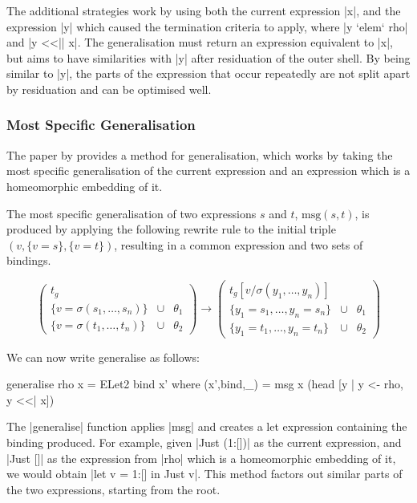 The additional strategies work by using both the current expression |x|, and the expression |y| which caused the termination criteria to apply, where |y `elem` rho| and |y <<|| x|. The generalisation must return an expression equivalent to |x|, but aims to have similarities with |y| after residuation of the outer shell. By being similar to |y|, the parts of the expression that occur repeatedly are not split apart by residuation and can be optimised well.

\subsubsection{Most Specific Generalisation}

The paper by \citet{sorensen:supercompilation} provides a method for generalisation, which works by taking the most specific generalisation of the current expression and an expression which is a homeomorphic embedding of it.

The most specific generalisation of two expressions $s$ and $t$, $\text{msg}(s,t)$, is produced by applying the following rewrite rule to the initial triple \linebreak $(v,\{v=s\},\{v=t\})$, resulting in a common expression and two sets of bindings.

\[
\left( \begin{array}{lcl}
	t_g \\
	\{v = \sigma(s_1,\ldots,s_n)\} & \cup & \theta_1 \\
	\{v = \sigma(t_1,\ldots,t_n)\} & \cup & \theta_2
	\end{array} \right)
\rightarrow
\left( \begin{array}{lcl}
	t_g[v / \sigma(y_1,\ldots,y_n)] \\
	\{y_1 = s_1,\ldots,y_n = s_n\} & \cup & \theta_1 \\
	\{y_1 = t_1,\ldots,y_n = t_n\} & \cup & \theta_2
	\end{array} \right)
\]

We can now write generalise as follows:

\begin{code}
generalise rho x = ELet2 bind x'
    where (x',bind,_) = msg x (head [y | y <- rho, y <<| x])
\end{code}

The |generalise| function applies |msg| and creates a let expression containing the binding produced. For example, given |Just (1:[])| as the current expression, and |Just []| as the expression from |rho| which is a homeomorphic embedding of it, we would obtain |let v = 1:[] in Just v|. This method factors out similar parts of the two expressions, starting from the root.

